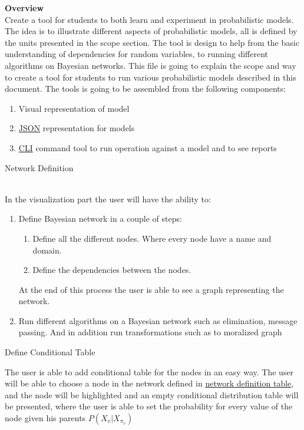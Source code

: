 \textbf{Overview}\\
    Create a tool for students to both learn and experiment in probabilistic models. The idea is to illustrate different aspects of probabilistic models, all is defined by the units presented in the scope section.
    The tool is design to help from the basic understanding of dependencies for random variables, to running different algorithms on Bayesian networks.
    This file is going to explain the scope and way to create a tool for students to run various probabilistic models described in this document. The tools is going to be assembled from the following components:
    \begin{enumerate}
        \item Visual representation of model
        \item \hyperlink{JSON}{JSON} representation for models
        \item \hyperlink{CLI}{CLI} command tool to run operation against a model and to see reports
    \end{enumerate}

    \hypertarget{network_defeniton}{Network Definition}\\
    In the visualization part the user will have the ability to:
    \begin{enumerate}
        \item Define Bayesian network in a couple of steps:
        \begin{enumerate}
            \item Define all the different nodes. Where every node have a name and domain.
            \item Define the dependencies between the nodes.
        \end{enumerate}
        At the end of this process the user is able to see a graph representing the network.
        \item Run different algorithms on a Bayesian network such as elimination, message passing. And in addition run transformations such as to moralized graph 
    \end{enumerate}

    \hypertarget{define conditional table}{ Define Conditional Table}
    The user is able to add conditional table for the nodes in an easy way. The user will be able to choose a node in the network defined in \hyperlink{network definition}{network definition table},
    and the node will be highlighted and an empty conditional distribution table will be presented, where the user is able to set the probability for every value of
    the node given his parents $P(X_v|X_{\pi_v})$


